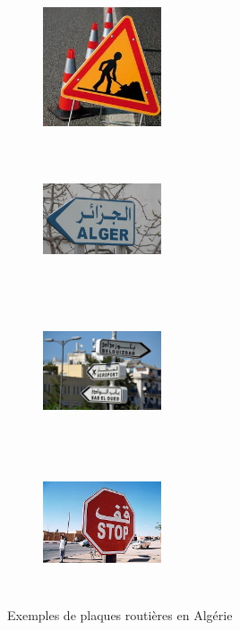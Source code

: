 \begin{figure}[htp!]
     \centering
      \begin{subfigure}
          \centering    
              \includegraphics[width=3.5cm,height=4cm]{images/ii.jpg}
              \end{subfigure}
           \hfill
     \begin{subfigure}
              \centering  
       \includegraphics[width=3.5cm,height=4cm]{images/300.jpg}
     \end{subfigure}
          \hfill
     \begin{subfigure}
             \centering     
            \includegraphics[width=3.5cm,height=4cm]{images/3.jpg}
     \end{subfigure}
           \hfill
     \begin{subfigure}
              \centering    
            \includegraphics[width=3.5cm,height=4cm]{images/5.jpg}
     \end{subfigure}
      \caption{Exemples de plaques routières en Algérie}
       \label{fig: panneaux-al}
\end{figure}

